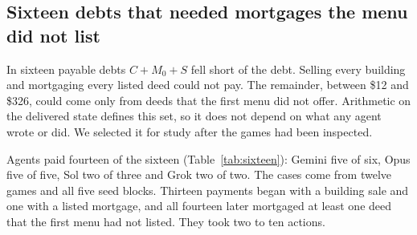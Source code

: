 \documentclass[11pt,letterpaper]{article}
\begin{document}
\subsection{Sixteen debts that needed mortgages the menu did not list}

In sixteen payable debts $C+M_0+S$ fell short of the debt. Selling every building and mortgaging every listed deed could not pay. The remainder, between \$12 and \$326, could come only from deeds that the first menu did not offer. Arithmetic on the delivered state defines this set, so it does not depend on what any agent wrote or did. We selected it for study after the games had been inspected.

Agents paid fourteen of the sixteen (Table~\ref{tab:sixteen}): Gemini five of six, Opus five of five, Sol two of three and Grok two of two. The cases come from twelve games and all five seed blocks. Thirteen payments began with a building sale and one with a listed mortgage, and all fourteen later mortgaged at least one deed that the first menu had not listed. They took two to ten actions.
\end{document}
